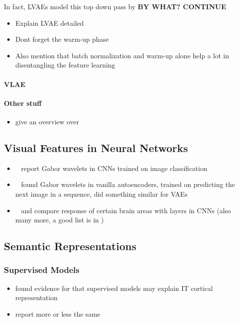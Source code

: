 In fact, \acp{LVAE} model this top down pass by \textbf{BY WHAT? CONTINUE}
\begin{itemize}
    \item Explain LVAE detailed
    \item Dont forget the warm-up phase
    \item Also mention that batch normalization and warm-up alone help a lot in disentangling the feature learning
\end{itemize}

\paragraph{\acl{VLAE}}

\paragraph{Other stuff}
\begin{itemize}
    \item \citet{tschannen2018recent} give an overview over 
\end{itemize}

\subsection{Visual Features in Neural Networks}\label{subsec:visual_features_in_neural_networks}
\begin{itemize}
    \item~\citet{krizhevsky2012imagenet} report Gabor wavelets in \acp{CNN} trained on image classification
    \item~\citet{palm2012prediction} found Gabor wavelets in vanilla autoencoders, trained on predicting the next image in a sequence, \citet{walker2016uncertain} did something similar for VAEs
    \item~\citet{eickenberg2017seeing} and \citet{wen2018neural} compare response of certain brain areas with layers in CNNs (also many more, a good list is in \citet{wen2018neural})
\end{itemize}

\subsection{Semantic Representations}\label{subsec:semantic-representations}

\subsubsection{Supervised Models}
\begin{itemize}
    \item \citet{khaligh2014deep} found evidence for that supervised models may explain \ac{IT} cortical representation
    \item \citet{cadieu2014deep} report more or less the same
\end{itemize}

